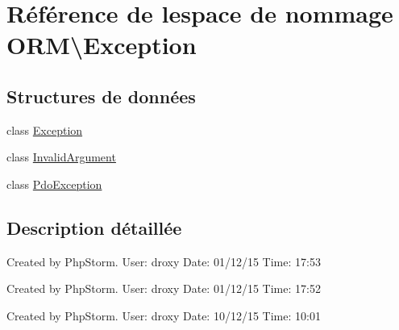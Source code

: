 \hypertarget{namespace_o_r_m_1_1_exception}{}\section{Référence de l\textquotesingle{}espace de nommage O\+RM\textbackslash{}Exception}
\label{namespace_o_r_m_1_1_exception}
\subsection*{Structures de données}
\begin{DoxyCompactItemize}
\item 
class \hyperlink{class_o_r_m_1_1_exception_1_1_exception}{Exception}
\item 
class \hyperlink{class_o_r_m_1_1_exception_1_1_invalid_argument}{Invalid\+Argument}
\item 
class \hyperlink{class_o_r_m_1_1_exception_1_1_pdo_exception}{Pdo\+Exception}
\end{DoxyCompactItemize}


\subsection{Description détaillée}
Created by Php\+Storm. User\+: droxy Date\+: 01/12/15 Time\+: 17\+:53

Created by Php\+Storm. User\+: droxy Date\+: 01/12/15 Time\+: 17\+:52

Created by Php\+Storm. User\+: droxy Date\+: 10/12/15 Time\+: 10\+:01 